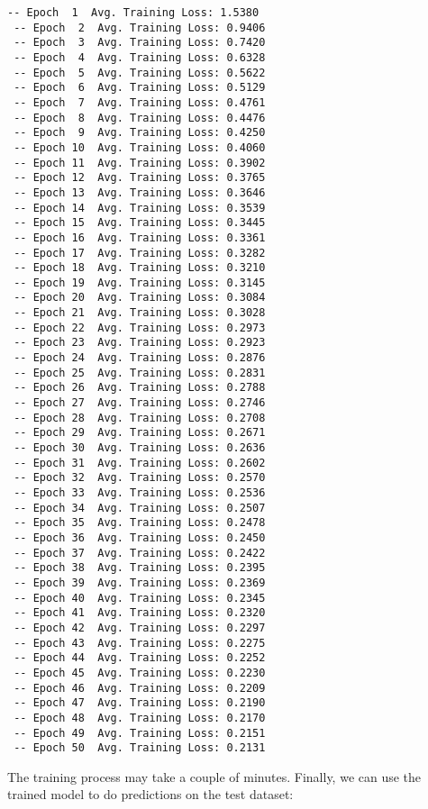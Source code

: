 \documentclass[11pt]{article}
\begin{document}
    \begin{Verbatim}[commandchars=\\\{\}]
 -- Epoch  1  Avg. Training Loss: 1.5380
 -- Epoch  2  Avg. Training Loss: 0.9406
 -- Epoch  3  Avg. Training Loss: 0.7420
 -- Epoch  4  Avg. Training Loss: 0.6328
 -- Epoch  5  Avg. Training Loss: 0.5622
 -- Epoch  6  Avg. Training Loss: 0.5129
 -- Epoch  7  Avg. Training Loss: 0.4761
 -- Epoch  8  Avg. Training Loss: 0.4476
 -- Epoch  9  Avg. Training Loss: 0.4250
 -- Epoch 10  Avg. Training Loss: 0.4060
 -- Epoch 11  Avg. Training Loss: 0.3902
 -- Epoch 12  Avg. Training Loss: 0.3765
 -- Epoch 13  Avg. Training Loss: 0.3646
 -- Epoch 14  Avg. Training Loss: 0.3539
 -- Epoch 15  Avg. Training Loss: 0.3445
 -- Epoch 16  Avg. Training Loss: 0.3361
 -- Epoch 17  Avg. Training Loss: 0.3282
 -- Epoch 18  Avg. Training Loss: 0.3210
 -- Epoch 19  Avg. Training Loss: 0.3145
 -- Epoch 20  Avg. Training Loss: 0.3084
 -- Epoch 21  Avg. Training Loss: 0.3028
 -- Epoch 22  Avg. Training Loss: 0.2973
 -- Epoch 23  Avg. Training Loss: 0.2923
 -- Epoch 24  Avg. Training Loss: 0.2876
 -- Epoch 25  Avg. Training Loss: 0.2831
 -- Epoch 26  Avg. Training Loss: 0.2788
 -- Epoch 27  Avg. Training Loss: 0.2746
 -- Epoch 28  Avg. Training Loss: 0.2708
 -- Epoch 29  Avg. Training Loss: 0.2671
 -- Epoch 30  Avg. Training Loss: 0.2636
 -- Epoch 31  Avg. Training Loss: 0.2602
 -- Epoch 32  Avg. Training Loss: 0.2570
 -- Epoch 33  Avg. Training Loss: 0.2536
 -- Epoch 34  Avg. Training Loss: 0.2507
 -- Epoch 35  Avg. Training Loss: 0.2478
 -- Epoch 36  Avg. Training Loss: 0.2450
 -- Epoch 37  Avg. Training Loss: 0.2422
 -- Epoch 38  Avg. Training Loss: 0.2395
 -- Epoch 39  Avg. Training Loss: 0.2369
 -- Epoch 40  Avg. Training Loss: 0.2345
 -- Epoch 41  Avg. Training Loss: 0.2320
 -- Epoch 42  Avg. Training Loss: 0.2297
 -- Epoch 43  Avg. Training Loss: 0.2275
 -- Epoch 44  Avg. Training Loss: 0.2252
 -- Epoch 45  Avg. Training Loss: 0.2230
 -- Epoch 46  Avg. Training Loss: 0.2209
 -- Epoch 47  Avg. Training Loss: 0.2190
 -- Epoch 48  Avg. Training Loss: 0.2170
 -- Epoch 49  Avg. Training Loss: 0.2151
 -- Epoch 50  Avg. Training Loss: 0.2131

    \end{Verbatim}

    The training process may take a couple of minutes. Finally, we can use
the trained model to do predictions on the test dataset:
\end{document}
